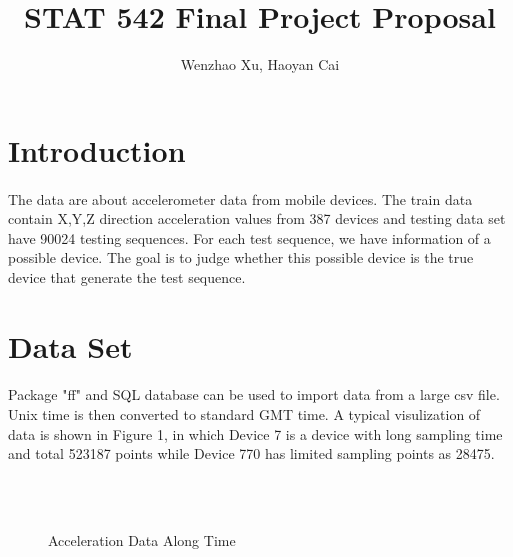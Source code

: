 \documentclass{article}
\author{Wenzhao Xu, Haoyan Cai}
\title{STAT 542 Final Project Proposal}
\begin{document}
	\maketitle
	
	\section{Introduction} %
	\label{sec:introduction}
	
	\paragraph{} The data are about accelerometer data from mobile devices. The train data contain X,Y,Z direction acceleration values from 387 devices and testing data set have 90024 testing sequences. For each test sequence, we have information of a possible device. The goal is to judge whether this possible device is the true device that generate the test sequence. 
	
	\section{Data Set} %
	\label{sec:section_name}
	\paragraph{}
	Package "ff" and SQL database can be used to import data from a large csv file. Unix time is then converted to standard GMT time. A typical visulization of data is shown in Figure 1, in which Device 7 is a device with long sampling time and total 523187 points while Device 770 has limited sampling points as 28475.
	\begin{figure}
		\centering
		\\
		 \\
		\caption{Acceleration Data Along Time}
	\end{figure}
	
\end{document}
